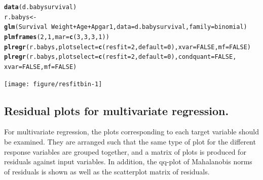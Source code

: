 \documentclass[11pt]{article}\usepackage[]{graphicx}\usepackage[]{color}
\makeatletter
\newcommand{\hlnum}[1]{\textcolor[rgb]{0.686,0.059,0.569}{#1}}%
\newcommand{\hlopt}[1]{\textcolor[rgb]{0,0,0}{#1}}%
\newcommand{\hlstd}[1]{\textcolor[rgb]{0.345,0.345,0.345}{#1}}%
\newcommand{\hlkwb}[1]{\textcolor[rgb]{0.69,0.353,0.396}{#1}}%
\newcommand{\hlkwc}[1]{\textcolor[rgb]{0.333,0.667,0.333}{#1}}%
\newcommand{\hlkwd}[1]{\textcolor[rgb]{0.737,0.353,0.396}{\textbf{#1}}}%
\newenvironment{kframe}{%
 \def\at@end@of@kframe{}%
 \ifinner\ifhmode%
  \def\at@end@of@kframe{\end{minipage}}%
  \begin{minipage}{\columnwidth}%
 \fi\fi%
 \def\FrameCommand##1{\hskip\@totalleftmargin \hskip-\fboxsep
 \colorbox{shadecolor}{##1}\hskip-\fboxsep
     \hskip-\linewidth \hskip-\@totalleftmargin \hskip\columnwidth}%
 \MakeFramed {\advance\hsize-\width
   \@totalleftmargin\z@ \linewidth\hsize
   \@setminipage}}%
 {\par\unskip\endMakeFramed%
 \at@end@of@kframe}
\newenvironment{knitrout}{}{} %
\makeatother
\begin{document}
\begin{knitrout}
\color{fgcolor}\begin{kframe}
\begin{alltt}
  \hlkwd{data}\hlstd{(d.babysurvival)}
  \hlstd{r.babys} \hlkwb{<-} \hlkwd{glm}\hlstd{(Survival}\hlopt{~}\hlstd{Weight}\hlopt{+}\hlstd{Age}\hlopt{+}\hlstd{Apgar1,}\hlkwc{data}\hlstd{=d.babysurvival,}\hlkwc{family}\hlstd{=binomial)}
  \hlkwd{plmframes}\hlstd{(}\hlnum{2}\hlstd{,}\hlnum{1}\hlstd{,} \hlkwc{mar}\hlstd{=}\hlkwd{c}\hlstd{(}\hlnum{3}\hlstd{,}\hlnum{3}\hlstd{,}\hlnum{3}\hlstd{,}\hlnum{1}\hlstd{))}
  \hlkwd{plregr}\hlstd{(r.babys,} \hlkwc{plotselect}\hlstd{=}\hlkwd{c}\hlstd{(}\hlkwc{resfit}\hlstd{=}\hlnum{2}\hlstd{,} \hlkwc{default}\hlstd{=}\hlnum{0}\hlstd{),} \hlkwc{xvar}\hlstd{=}\hlnum{FALSE}\hlstd{,} \hlkwc{mf}\hlstd{=}\hlnum{FALSE}\hlstd{)}
  \hlkwd{plregr}\hlstd{(r.babys,} \hlkwc{plotselect}\hlstd{=}\hlkwd{c}\hlstd{(}\hlkwc{resfit}\hlstd{=}\hlnum{2}\hlstd{,} \hlkwc{default}\hlstd{=}\hlnum{0}\hlstd{),} \hlkwc{condquant}\hlstd{=}\hlnum{FALSE}\hlstd{,}
            \hlkwc{xvar}\hlstd{=}\hlnum{FALSE}\hlstd{,} \hlkwc{mf}\hlstd{=}\hlnum{FALSE}\hlstd{)}
\end{alltt}
\end{kframe}
\texttt{[image: figure/resfitbin-1]} 

\end{knitrout}


\subsection{Residual plots for multivariate regression.}
For multivariate regression, the plots corresponding to each target
variable should be examined. 
They are arranged such that the same type of plot for the different
response variables are grouped together, and a matrix of plots is produced
for residuals against input variables.
In addition, the qq-plot of Mahalanobis norms of residuals is shown as well
as the scatterplot matrix of residuals.

\end{document}
